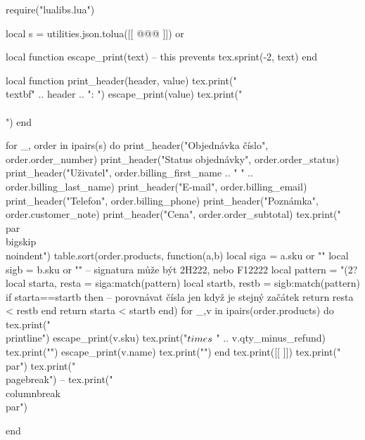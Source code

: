 \documentclass[landscape,a4page]{article}
\begin{document}
\columnseprule=0.3pt
\columnsep=20pt
\parindent=0pt
\parskip=2pt
\newcommand\printline[2]{\parbox{.2\linewidth}{#1}~\parbox{.7\linewidth}{#2}\\}

\begin{multicols*}{3}
  \sloppy

\begin{luacode*}
require("lualibs.lua")

local s =  utilities.json.tolua([[
@@@
]]) or {}



local function escape_print(text)
  -- this prevents
  tex.sprint(-2, text)
end

local function print_header(header, value)
  tex.print("\\textbf{" .. header .. ":} ")
  escape_print(value)
  tex.print("\\\\")
end


for _, order in ipairs(s) do
  print_header("Objednávka číslo", order.order_number)
  print_header("Status objednávky", order.order_status)
  print_header("Uživatel", order.billing_first_name .. " " .. order.billing_last_name)
  print_header("E-mail", order.billing_email)
  print_header("Telefon", order.billing_phone)
  print_header("Poznámka", order.customer_note)
  print_header("Cena", order.order_subtotal)
  tex.print("\\par\\bigskip\\noindent")
  table.sort(order.products, function(a,b)
    local siga = a.sku or ""
    local sigb = b.sku or ""
    -- signatura může být 2H222, nebo F12222
    local pattern = "(2?%
    local starta, resta = siga:match(pattern)
    local startb, restb = sigb:match(pattern)
    if starta==startb then
      -- porovnávat čísla jen když je stejný začátek
      return resta < restb 
    end
    return starta < startb
  end)
  for _,v in ipairs(order.products) do
    tex.print("\\printline{")
    escape_print(v.sku)
    tex.print("$\\times$ " .. v.qty_minus_refund)
    tex.print("}{")
    escape_print(v.name)
  tex.print("}")
  end
  tex.print([[
  \vfill
  \null
  ]])
  tex.print("\\par")
  tex.print("\\pagebreak")
  -- tex.print("\\columnbreak\\par")


end



\end{luacode*}
\end{multicols*}
\end{document}
